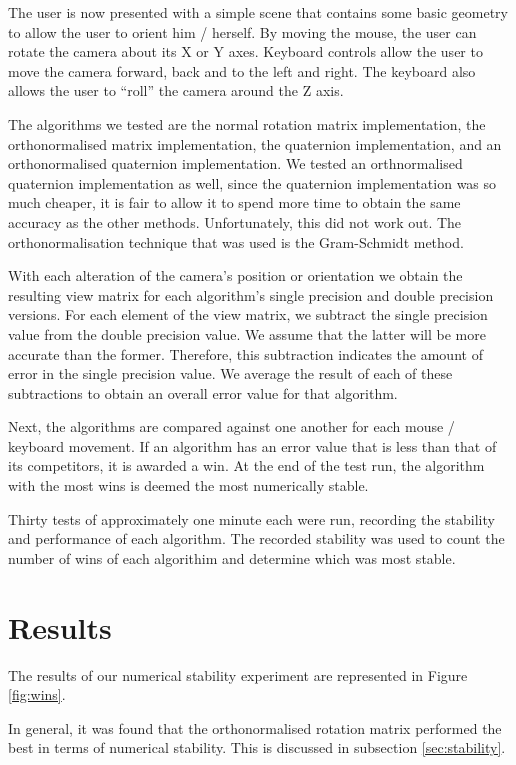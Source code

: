 \documentclass{acm_proc_article-sp}
\begin{document}
The user is now presented with a simple scene that contains some basic geometry to allow the user to orient him / herself.
By moving the mouse, the user can rotate the camera about its X or Y axes.
Keyboard controls allow the user to move the camera forward, back and to the left and right.
The keyboard also allows the user to ``roll'' the camera around the Z axis.

The algorithms we tested are the normal rotation matrix implementation, the orthonormalised matrix implementation, the quaternion implementation, and an orthonormalised quaternion implementation.
We tested an orthnormalised quaternion implementation as well, since the quaternion implementation was so much cheaper, it is fair to allow it to spend more time to obtain the same accuracy as the other methods.
Unfortunately, this did not work out.
The orthonormalisation technique that was used is the Gram-Schmidt method.

With each alteration of the camera's position or orientation we obtain the resulting view matrix for each algorithm's single precision and double precision versions.
For each element of the view matrix, we subtract the single precision value from the double precision value.
We assume that the latter will be more accurate than the former.
Therefore, this subtraction indicates the amount of error in the single precision value.
We average the result of each of these subtractions to obtain an overall error value for that algorithm.

Next, the algorithms are compared against one another for each mouse / keyboard movement.
If an algorithm has an error value that is less than that of its competitors, it is awarded a win.
At the end of the test run, the algorithm with the most wins is deemed the most numerically stable.

Thirty tests of approximately one minute each were run, recording the stability and performance of each algorithm. The recorded stability was used to count the number of wins of each algorithim and determine which was most stable.

\section{Results}

The results of our numerical stability experiment are represented in Figure \ref{fig:wins}.

In general, it was found that the orthonormalised rotation matrix performed the best in terms of numerical stability.
This is discussed in subsection \ref{sec:stability}.
\end{document}
